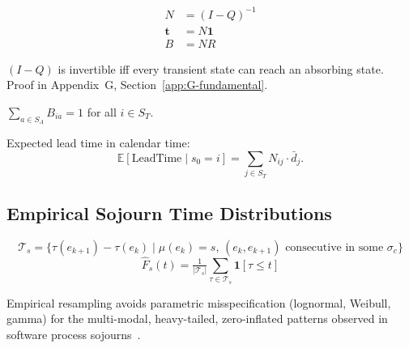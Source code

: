\begin{align}
N &= (I - Q)^{-1} \label{eq:fundamental-computation} \\
\mathbf{t} &= N \mathbf{1} \label{eq:expected-steps} \\
B &= N R \label{eq:absorption-prob}
\end{align}

\begin{property}[Invertibility]
\label{prop:invertibility}
$(I - Q)$ is invertible iff every transient state can reach an absorbing
state. Proof in Appendix~G, Section~\ref{app:G-fundamental}.
\end{property}

\begin{property}
\label{prop:absorption-certainty}
$\sum_{a \in S_A} B_{ia} = 1$ for all $i \in S_T$.
\end{property}

Expected lead time in calendar time:
\begin{equation}
\label{eq:expected-lead-time}
\mathbb{E}[\text{LeadTime} \mid s_0 = i] = \sum_{j \in S_T} N_{ij} \cdot \bar{d}_j.
\end{equation}


\subsection{Empirical Sojourn Time Distributions}
\label{sec:s3-sojourn}

\begin{definition}
\label{def:sojourn-distribution}
\begin{equation}
\label{eq:sojourn-obs}
\mathcal{T}_s = \{\tau(e_{k+1}) - \tau(e_k) \mid \mu(e_k) = s,\,
    (e_k, e_{k+1}) \text{ consecutive in some } \sigma_c\}
\end{equation}
\begin{equation}
\label{eq:ecdf}
\hat{F}_s(t) = \tfrac{1}{|\mathcal{T}_s|} \sum_{\tau \in \mathcal{T}_s}
    \mathbf{1}[\tau \leq t]
\end{equation}
\end{definition}

\begin{remark}
\label{rem:nonparametric}
Empirical resampling avoids parametric misspecification (lognormal,
Weibull, gamma) for the multi-modal, heavy-tailed, zero-inflated patterns
observed in software process sojourns~\cite{vacanti2015}.
\end{remark}


